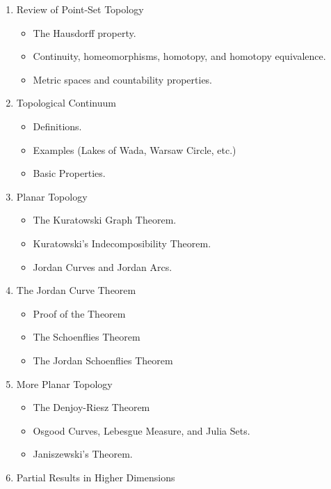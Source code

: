 \documentclass{article}
\begin{document}
    \begin{enumerate}
        \item Review of Point-Set Topology
            \begin{itemize}
                \item The Hausdorff property.
                \item Continuity, homeomorphisms, homotopy, and
                    homotopy equivalence.
                \item Metric spaces and countability properties.
            \end{itemize}
        \item Topological Continuum
            \begin{itemize}
                \item Definitions.
                \item Examples (Lakes of Wada, Warsaw Circle, etc.)
                \item Basic Properties.
            \end{itemize}
        \item Planar Topology
            \begin{itemize}
                \item The Kuratowski Graph Theorem.
                \item Kuratowski's Indecomposibility Theorem.
                \item Jordan Curves and Jordan Arcs.
            \end{itemize}
        \item The Jordan Curve Theorem
            \begin{itemize}
                \item Proof of the Theorem
                \item The Schoenflies Theorem
                \item The Jordan Schoenflies Theorem
            \end{itemize}
        \item More Planar Topology
            \begin{itemize}
                \item The Denjoy-Riesz Theorem
                \item Osgood Curves, Lebesgue Measure, and Julia Sets.
                \item Janiszewski’s Theorem.
            \end{itemize}
        \item Partial Results in Higher Dimensions

\end{enumerate}
\end{document}

